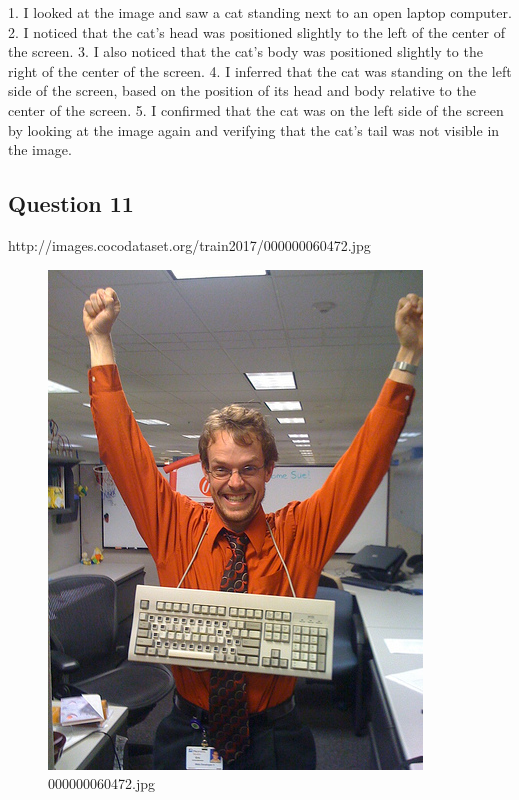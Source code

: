 \begin{enumerate}
        1. I looked at the image and saw a cat standing next to an open laptop computer.
        2. I noticed that the cat’s head was positioned slightly to the left of the center of the screen.
        3. I also noticed that the cat’s body was positioned slightly to the right of the center of the screen.
        4. I inferred that the cat was standing on the left side of the screen, based on the position of its head and body relative to the center of the screen.
        5. I confirmed that the cat was on the left side of the screen by looking at the image again and verifying that the cat’s tail was not visible in the image.
        
    \end{enumerate}
\subsection*{Question 11}
http://images.cocodataset.org/train2017/000000060472.jpg
    \begin{figure}[h]
        \centering
        \includegraphics[width=0.8\linewidth]{../image set/easy/000000060472.jpg}
        \caption{000000060472.jpg}
    \end{figure}
